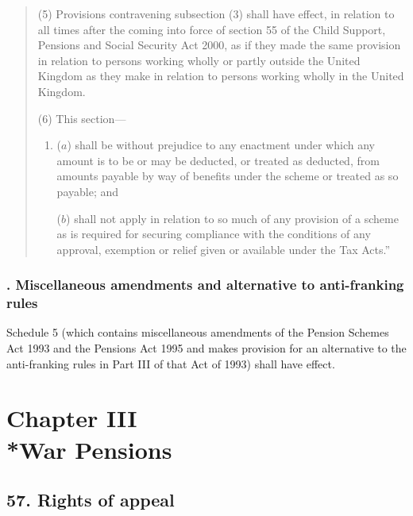 \documentclass[12pt,a4paper]{article}
\begin{document}
\begin{quotation}
(5) Provisions contravening subsection (3)  shall have effect, in relation to all times after the coming into force of section 55 of the Child Support, Pensions and Social Security Act 2000, as if they made the same provision in relation to persons working wholly or partly outside the United Kingdom as they make in relation to persons working wholly in the United Kingdom.

(6) This section—
\begin{enumerate}\item[]
($a$) shall be without prejudice to any enactment under which any amount is to be or may be deducted, or treated as deducted, from amounts payable by way of benefits under the scheme or treated as so payable; and

($b$) shall not apply in relation to so much of any provision of a scheme as is required for securing compliance with the conditions of any approval, exemption or relief given or available under the Tax Acts.”
\end{enumerate}
\end{quotation}

\subsubsection[56. Miscellaneous amendments and alternative to anti-franking rules]{. Miscellaneous amendments and alternative to anti-franking rules}

Schedule 5 (which contains miscellaneous amendments of the Pension Schemes Act 1993 and the Pensions Act 1995 and makes provision for an alternative to the anti-franking rules in Part III of that Act of 1993) shall have effect.

\section[Chapter III --- War Pensions]{Chapter III\\*War Pensions}

\renewcommand\parthead{--- Part II Chapter III}

\subsection{57. Rights of appeal}
\end{document}
